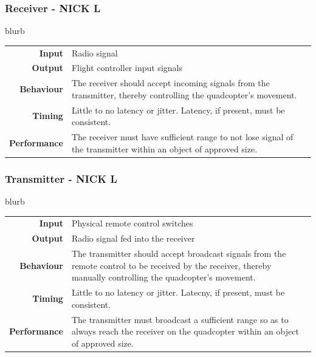 \documentclass[10pt,letterpaper]{article}
\begin{document}
\subsubsection{Receiver - NICK L}
blurb
\begin{center}
  \begin{tabular}{r p{8.5cm}}
      \textbf{Input} & Radio signal \\
      \textbf{Output} & Flight controller input signals \\
      \textbf{Behaviour} & The receiver should accept incoming signals from the transmitter, thereby controlling the quadcopter's movement. \\
      \textbf{Timing} & Little to no latency or jitter. Latency, if present, must be consistent. \\
      \textbf{Performance} & The receiver must have sufficient range to not lose signal of the transmitter within an object of approved size.
  \end{tabular}
\end{center}

\subsubsection{Transmitter - NICK L}
blurb
\begin{center}
  \begin{tabular}{r p{8.5cm}}
      \textbf{Input} & Physical remote control switches \\
      \textbf{Output} & Radio signal fed into the receiver \\
      \textbf{Behaviour} & The transmitter should accept broadcast signals from the remote control to be received by the receiver, thereby manually controlling the quadcopter's movement. \\
      \textbf{Timing} & Little to no latency or jitter. Latecny, if present, must be consistent. \\
      \textbf{Performance} & The transmitter must broadcast a sufficient range so as to always reach the receiver on the quadcopter within an object of approved size.
  \end{tabular}
\end{center}
\end{document}
